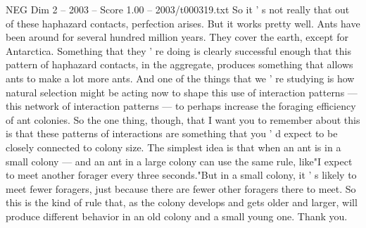 \begin{textsample}{NEG Dim 2 – 2003 – Score 1.00 – 2003/t000319.txt}
So it ' s not really that out of these haphazard contacts, perfection arises.
But it works pretty well.
Ants have been around for several hundred million years.
They cover the earth, except for Antarctica.
Something that they ' re doing is clearly successful enough that this pattern of haphazard contacts, in the aggregate, produces something that allows ants to make a lot more ants.
And one of the things that we ' re studying is how natural selection might be acting now to shape this use of interaction patterns — this network of interaction patterns — to perhaps increase the foraging efficiency of ant colonies.
So the one thing, though, that I want you to remember about this is that these patterns of interactions are something that you ' d expect to be closely connected to colony size.
The simplest idea is that when an ant is in a small colony — and an ant in a large colony can use the same rule, like"I expect to meet another forager every three seconds."But in a small colony, it ' s likely to meet fewer foragers, just because there are fewer other foragers there to meet.
So this is the kind of rule that, as the colony develops and gets older and larger, will produce different behavior in an old colony and a small young one.
Thank you.

\end{textsample}
